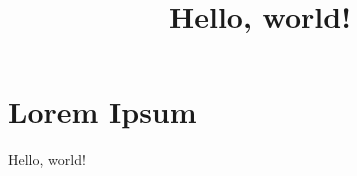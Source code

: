 \documentclass[article]{12pt}
\begin{document}
\title{Hello, world!}
\maketitle

\section{Lorem Ipsum}
Hello, world!
\end{document}
